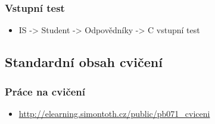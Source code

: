 \begin{frame}
	\frametitle{Vstupní test}
	\begin{itemize}
		\item{IS -> Student -> Odpovědníky -> C vstupní test}
	\end{itemize}
\end{frame}

\subsection{Standardní obsah cvičení}

\begin{frame}
	\frametitle{Práce na cvičení}
	\begin{itemize}
		\item{\href{http://elearning.simontoth.cz/public/pb071\_cviceni}{http://elearning.simontoth.cz/public/pb071\_cviceni}}
	\end{itemize}
\end{frame}




